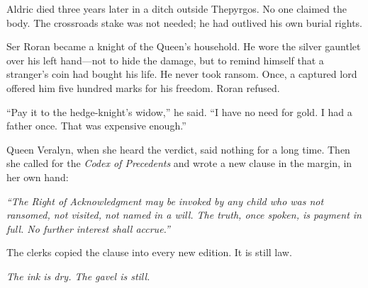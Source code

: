 \documentclass[11pt]{book}
\begin{document}
Aldric died three years later in a ditch outside Thepyrgos. No one claimed the body. The crossroads stake was not needed; he had outlived his own burial rights.

Ser Roran became a knight of the Queen's household. He wore the silver gauntlet over his left hand---not to hide the damage, but to remind himself that a stranger's coin had bought his life. He never took ransom. Once, a captured lord offered him five hundred marks for his freedom. Roran refused.

``Pay it to the hedge-knight's widow,'' he said. ``I have no need for gold. I had a father once. That was expensive enough.''

Queen Veralyn, when she heard the verdict, said nothing for a long time. Then she called for the \textit{Codex of Precedents} and wrote a new clause in the margin, in her own hand:

\emph{``The Right of Acknowledgment may be invoked by any child who was not ransomed, not visited, not named in a will. The truth, once spoken, is payment in full. No further interest shall accrue.''}

The clerks copied the clause into every new edition. It is still law.

\vspace{1cm}
\begin{center}
\textit{The ink is dry. The gavel is still.}
\end{center}
\end{document}
